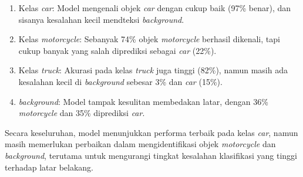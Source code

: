 \begin{enumerate}[nosep]
	\item Kelas \emph{car}:
	Model mengenali objek \emph{car} dengan cukup baik (97\% benar), dan sisanya kesalahan kecil mendteksi \emph{background}.

	\item Kelas \emph{motorcycle}:
	Sebanyak 74\% objek \emph{motorcycle} berhasil dikenali, tapi cukup banyak yang salah diprediksi sebagai \emph{car} (22\%).

	\item Kelas \emph{truck}:
	Akurasi pada kelas \emph{truck} juga tinggi (82\%), namun masih ada kesalahan kecil di \emph{background} sebesar 3\% dan \emph{car} (15\%).

	\item \emph{background}:
	Model tampak kesulitan membedakan latar, dengan 36\% \emph{motorcycle} dan 35\% diprediksi \emph{car}.
\end{enumerate}

Secara keseluruhan, model menunjukkan performa terbaik pada kelas \emph{car}, namun masih memerlukan perbaikan dalam mengidentifikasi objek \emph{motorcycle} dan \emph{background}, terutama untuk mengurangi tingkat kesalahan klasifikasi yang tinggi terhadap latar belakang.

